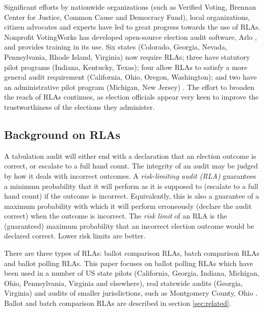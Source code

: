 Significant efforts by nationwide organizations (such as Verified Voting, Brennan Center for Justice, Common Cause and Democracy Fund), local organizations, citizen advocates and experts have led to great progress towards the use of RLAs. Nonprofit VotingWorks has developed open-source election audit software, Arlo \cite{arlo}, and provides training in its use. Six states (Colorado, Georgia, Nevada, Pennsylvania, Rhode Island, Virginia) now require RLAs; three have statutory pilot programs (Indiana, Kentucky, Texas); four allow RLAs to satisfy a more general audit requirement (California, Ohio, Oregon, Washington); and two have an administrative pilot program (Michigan, New Jersey) \cite{vv_audits}. The effort to broaden the reach of RLAs continues, as election officials appear very keen to improve the trustworthiness of the elections they administer. 

\subsection{Background on RLAs}
A tabulation audit will either end with a declaration that an election outcome is correct, or escalate to a full hand count. The integrity of an audit may be judged by how it deals with incorrect outcomes. A {\em risk-limiting audit (RLA)} guarantees a minimum probability that it will perform as it is supposed to (escalate to a full hand count) if the outcome is incorrect. Equivalently, this is also a guarantee of a maximum probability with which it will perform erroneously (declare the audit correct) when the outcome is incorrect. The {\em risk limit} of an RLA is the (guaranteed) maximum probability that an incorrect election outcome would be declared correct. Lower risk limits are better.  

There are three types of RLAs: ballot comparison RLAs, batch comparison RLAs and ballot polling RLAs. This paper focuses on ballot polling RLAs which have been used in a number of US state pilots (California, Georgia, Indiana, Michigan, Ohio, Pennsylvania, Virginia and elsewhere), real statewide audits (Georgia, Virginia) \cite{vv_audits} and  audits of smaller jurisdictions, such as Montgomery County, Ohio \cite{usenix_minerva}. Ballot and batch comparison RLAs are described in section \ref{sec:related}. 

